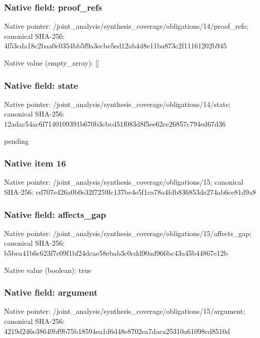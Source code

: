 \documentclass[10pt,a4paper]{article}
\begin{document}
\subsubsection{Native field: proof\_\allowbreak{}refs}
Native pointer: /joint\_\allowbreak{}analysis/synthesis\_\allowbreak{}coverage/obligations/14/proof\_\allowbreak{}refs; canonical SHA-256: 4f53cda18c2baa0c0354bb5f9a3ecbe5ed12ab4d8e11ba873c2f11161202b945

Native value (empty\_\allowbreak{}array): []

\subsubsection{Native field: state}
Native pointer: /joint\_\allowbreak{}analysis/synthesis\_\allowbreak{}coverage/obligations/14/state; canonical SHA-256: 12adac54ac6f7140109391b670b3cbcd51f083d8f5ee62ce26857c794ed67d36

\begingroup\raggedright\sloppy pending\par\endgroup

\subsubsection{Native item 16}
Native pointer: /joint\_\allowbreak{}analysis/synthesis\_\allowbreak{}coverage/obligations/15; canonical SHA-256: cd707e426a0b0e32f7259fc137be4e5f1ca78a4fdb836853de274ab6ce81d9a8

\subsubsection{Native field: affects\_\allowbreak{}gap}
Native pointer: /joint\_\allowbreak{}analysis/synthesis\_\allowbreak{}coverage/obligations/15/affects\_\allowbreak{}gap; canonical SHA-256: b5bea41b6c623f7c09f1bf24dcae58ebab3c0cdd90ad966bc43a45b44867e12b

Native value (boolean): true

\subsubsection{Native field: argument}
Native pointer: /joint\_\allowbreak{}analysis/synthesis\_\allowbreak{}coverage/obligations/15/argument; canonical SHA-256: 4219d246e38649bf9b75b18594ea1d6d48e8702ea7daca25310a61098cd8510d
\end{document}
